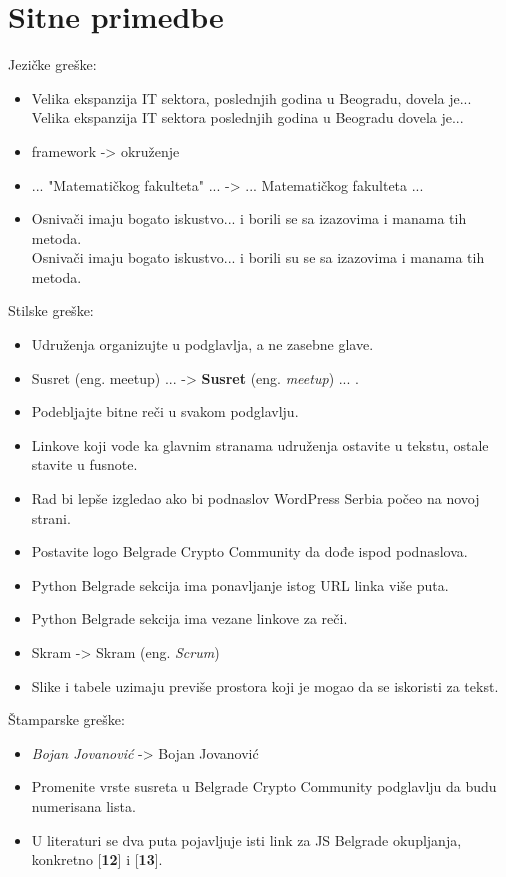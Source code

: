 \documentclass[a4paper]{report}
\begin{document}
\newpage
\section{Sitne primedbe}
Jezičke greške: \begin{itemize}
\item Velika ekspanzija IT sektora, poslednjih godina u Beogradu, dovela je...\\
      Velika ekspanzija IT sektora poslednjih godina u Beogradu dovela je...
\item framework -> okruženje
\item ... "Matematičkog fakulteta" ... -> ... Matematičkog fakulteta ... 
\item Osnivači imaju bogato iskustvo... i borili se sa izazovima i manama tih metoda. \\
      Osnivači imaju bogato iskustvo... i borili su se sa izazovima i manama tih metoda.
\end{itemize}

Stilske greške:\begin{itemize}
\item Udruženja organizujte u podglavlja, a ne zasebne glave.
\item Susret (eng. meetup) ... -> \textbf{Susret} (eng. \textit{meetup}) ... .
\item Podebljajte bitne reči u svakom podglavlju.
\item Linkove koji vode ka glavnim stranama udruženja ostavite u tekstu, ostale stavite u fusnote.
\item Rad bi lepše izgledao ako bi podnaslov WordPress Serbia počeo na novoj strani.
\item Postavite logo Belgrade Crypto Community da dođe ispod podnaslova.
\item Python Belgrade sekcija ima ponavljanje istog URL linka više puta.
\item Python Belgrade sekcija ima vezane linkove za reči.
\item Skram -> Skram (eng. \textit{Scrum})
\item Slike i tabele uzimaju previše prostora koji je mogao da se iskoristi za tekst.
\end{itemize}

Štamparske greške:\begin{itemize}
\item \textit{Bojan Jovanović} -> Bojan Jovanović
\item Promenite vrste susreta u Belgrade Crypto Community podglavlju da budu numerisana lista.
\item U literaturi se dva puta pojavljuje isti link za JS Belgrade okupljanja, konkretno
      [\textbf{12}] i [\textbf{13}].
\end{itemize}
\end{document}

